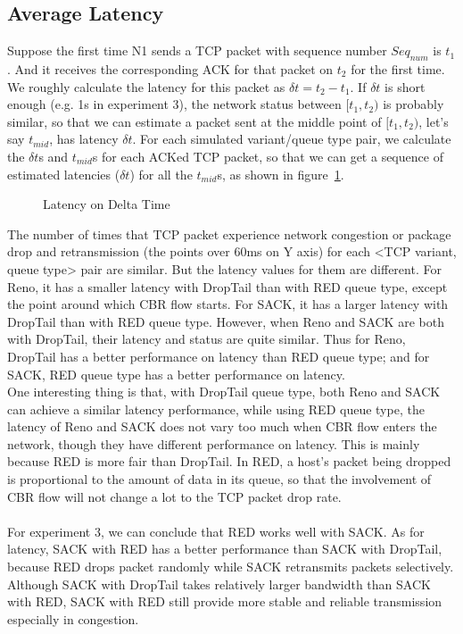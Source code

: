 \documentclass[10pt, conference]{lib/IEEEtran}
\begin{document}
\subsection{Average Latency}
Suppose the first time N1 sends a TCP packet with sequence number $Seq_{num}$ is $t_1$. And it receives the 
corresponding ACK for that packet on $t_2$ for the first time. We roughly calculate the latency for this packet as 
$\delta t = t_2 - t_1$. If $\delta t$ is short enough (e.g. 1s in experiment 3), the network status between $[t_1, t_2)$ 
is probably similar, so that we can estimate a packet sent at the middle point of $[t_1, t_2)$, let's say $t_{mid}$, 
has latency $\delta t$. For each simulated variant/queue type pair, we calculate the $\delta t$s and $t_{mid}$s for 
each ACKed TCP packet, so that we can get a sequence of estimated latencies ($\delta t$) for all the $t_{mid}$s, as 
shown in figure~\ref{fig:exp3_lt}.\\
\begin{figure}[!htb]
    \centering
    \resizebox{0.9\linewidth}{!}{}
    \caption{Latency on Delta Time}
    \label{fig:exp3_lt}
\end{figure}
The number of times that TCP packet experience network congestion or package drop and retransmission (the points over 60ms 
on Y axis) for each <TCP variant, queue type> pair are similar. But the latency values for them are different. For Reno, 
it has a smaller latency with DropTail than with RED queue type, except the point around which CBR flow starts. For SACK, 
it has a larger latency with DropTail than with RED queue type. However, when Reno and SACK are both with DropTail, their 
latency and status are quite similar. Thus for Reno, DropTail has a better performance on latency than RED queue type; and 
for SACK, RED queue type has a better performance on latency.\\
One interesting thing is that, with DropTail queue type, both Reno and SACK can achieve a similar latency performance, while 
using RED queue type, the latency of Reno and SACK does not vary too much when CBR flow enters the network, though they have 
different performance on latency. This is mainly because RED is more fair than DropTail. In RED, a host's packet being dropped 
is proportional to the amount of data in its queue, so that the involvement of CBR flow will not change a lot to the TCP packet 
drop rate.\\\\
For experiment 3, we can conclude that RED works well with SACK. As for latency, SACK with RED has a better performance than 
SACK with DropTail, because RED drops packet randomly while SACK retransmits packets selectively. Although SACK with DropTail 
takes relatively larger bandwidth than SACK with RED, SACK with RED still provide more stable and reliable transmission 
especially in congestion.
\end{document}
